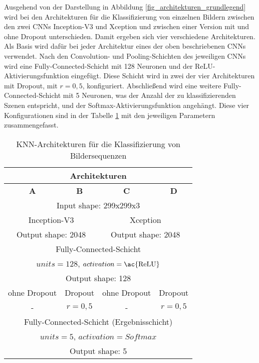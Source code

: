 Ausgehend von der Darstellung in Abbildung \ref{fig_architekturen_grundlegend} wird bei den Architekturen für die Klassifizierung von einzelnen Bildern zwischen den zwei \acp{CNN} Inception-V3 \cite{szegedy2016inception} und Xception \cite{chollet2017xception} und zwischen einer Version mit und ohne Dropout \cite{srivastava2014dropout} unterschieden. Damit ergeben sich vier verschiedene Architekturen. Als Basis wird dafür bei jeder Architektur eines der oben beschriebenen \acp{CNN} verwendet. Nach den Convolution- und Pooling-Schichten des jeweiligen \acp{CNN} wird eine Fully-Connected-Schicht mit 128 Neuronen und der \ac{ReLU}-Aktivierungsfunktion eingefügt. Diese Schicht wird in zwei der vier Architekturen mit Dropout, mit $r=0,5$, konfiguriert. Abschließend wird eine weitere Fully-Connected-Schicht mit 5 Neuronen, was der Anzahl der zu klassifizierenden Szenen entspricht, und der Softmax-Aktivierungsfunktion angehängt. Diese vier Konfigurationen sind in der Tabelle \ref{tab_architekturen_bild} mit den jeweiligen Parametern zusammengefasst.

\begin{table}[h]
\centering
\def\arraystretch{1.4}
\begin{tabular}{|c|c|c|c|}
\hline
\multicolumn{4}{|c|}{\textbf{Architekturen}} \\
\hline
\textbf{A} & \textbf{B} & \textbf{C} & \textbf{D} \\
\hline
\hline
\multicolumn{4}{|c|}{Input shape: 299x299x3} \\
\hline
\multicolumn{2}{|c|}{Inception-V3} & \multicolumn{2}{|c|}{Xception} \\
\multicolumn{2}{|c|}{Output shape: 2048} & \multicolumn{2}{|c|}{Output shape: 2048} \\
\hline
\multicolumn{4}{|c|}{Fully-Connected-Schicht} \\
\multicolumn{4}{|c|}{$units=128$, $activation=\text{\ac{ReLU}}$} \\
\multicolumn{4}{|c|}{Output shape: 128} \\
\hline
ohne Dropout & Dropout & ohne Dropout & Dropout \\
- & $r=0,5$ & - & $r=0,5$ \\
\hline
\multicolumn{4}{|c|}{Fully-Connected-Schicht (Ergebnisschicht)} \\
\multicolumn{4}{|c|}{$units=5$, $activation=Softmax$} \\
\multicolumn{4}{|c|}{Output shape: 5} \\
\hline
\end{tabular}
\caption{\ac{KNN}-Architekturen für die Klassifizierung von Bildersequenzen}
\label{tab_architekturen_bild}
\end{table}

